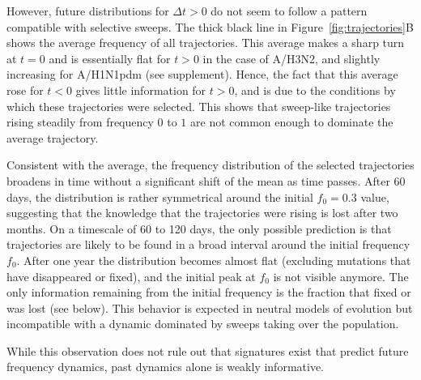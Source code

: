 \documentclass[reprint,amsmath,amssymb,superscriptaddress,showpacs,rmp]{revtex4-1}
\begin{document}
However, future distributions for $\Delta t >0$ do not seem to follow a pattern compatible with selective sweeps.
The thick black line in Figure~\ref{fig:trajectories}B shows the average frequency of all trajectories.
This average makes a sharp turn at $t=0$ and is essentially flat for $t>0$ in the case of A/H3N2, and slightly increasing for A/H1N1pdm (see supplement).
Hence, the fact that this average rose for $t<0$ gives little information for $t>0$, and is due to the conditions by which these trajectories were selected.
This shows that sweep-like trajectories rising steadily from frequency $0$ to $1$ are not common enough to dominate the average trajectory.  

Consistent with the average, the frequency distribution of the selected trajectories broadens in time without a significant shift of the mean as time passes.
After 60 days, the distribution is rather symmetrical around the initial $f_0=0.3$ value, suggesting that the knowledge that the trajectories were rising is lost after two months.
On a timescale of 60 to 120 days, the only possible prediction is that trajectories are likely to be found in a broad interval around the initial frequency $f_0$.
After one year the distribution becomes almost flat (excluding mutations that have disappeared or fixed), and the initial peak at $f_0$ is not visible anymore.
The only information remaining from the initial frequency is the fraction that fixed or was lost (see below).
This behavior is expected in neutral models of evolution \citep{kimura_diffusion_1964} but incompatible with a dynamic dominated by sweeps taking over the population.

While this observation does not rule out that signatures exist that predict future frequency dynamics, past dynamics alone is weakly informative.
\end{document}
